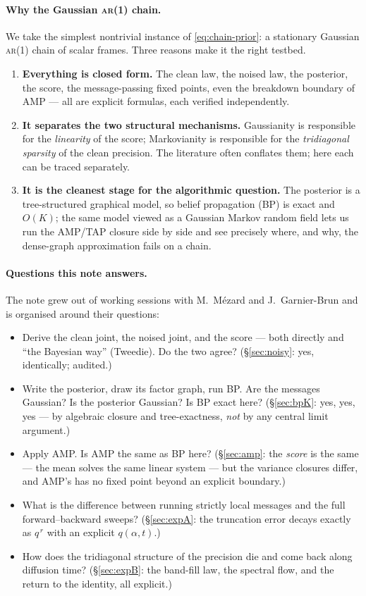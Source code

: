\documentclass[11pt]{article}
\theoremstyle{definition}
\begin{document}
\paragraph{Why the Gaussian \textsc{ar}(1) chain.}
We take the simplest nontrivial instance of \eqref{eq:chain-prior}: a
stationary Gaussian \textsc{ar}(1) chain of scalar frames. Three reasons make
it the right testbed.
\begin{enumerate}[leftmargin=1.6em, itemsep=1pt]
\item \textbf{Everything is closed form.} The clean law, the noised law, the
posterior, the score, the message-passing fixed points, even the breakdown
boundary of AMP --- all are explicit formulas, each verified independently.
\item \textbf{It separates the two structural mechanisms.} Gaussianity is
responsible for the \emph{linearity} of the score; Markovianity is responsible
for the \emph{tridiagonal sparsity} of the clean precision. The literature
often conflates them; here each can be traced separately.
\item \textbf{It is the cleanest stage for the algorithmic question.} The
posterior is a tree-structured graphical model, so belief propagation (BP) is
exact and $O(K)$; the same model viewed as a Gaussian Markov random field lets
us run the AMP/TAP closure side by side and see precisely where, and why, the
dense-graph approximation fails on a chain.
\end{enumerate}

\paragraph{Questions this note answers.}
The note grew out of working sessions with M.~M\'ezard and J.~Garnier-Brun and
is organised around their questions:
\begin{itemize}[leftmargin=1.6em, itemsep=1pt]
\item Derive the clean joint, the noised joint, and the score --- both directly
and ``the Bayesian way'' (Tweedie). Do the two agree? (\S\ref{sec:noisy}: yes,
identically; audited.)
\item Write the posterior, draw its factor graph, run BP. Are the messages
Gaussian? Is the posterior Gaussian? Is BP exact here? (\S\ref{sec:bpK}: yes,
yes, yes --- by algebraic closure and tree-exactness, \emph{not} by any central
limit argument.)
\item Apply AMP. Is AMP the same as BP here? (\S\ref{sec:amp}: the \emph{score}
is the same --- the mean solves the same linear system --- but the variance
closures differ, and AMP's has no fixed point beyond an explicit boundary.)
\item What is the difference between running strictly local messages and the
full forward--backward sweeps? (\S\ref{sec:expA}: the truncation error decays
exactly as $q^{\,r}$ with an explicit $q(\alpha,t)$.)
\item How does the tridiagonal structure of the precision die and come back
along diffusion time? (\S\ref{sec:expB}: the band-fill law, the spectral
flow, and the return to the identity, all explicit.)
\end{itemize}
\end{document}
